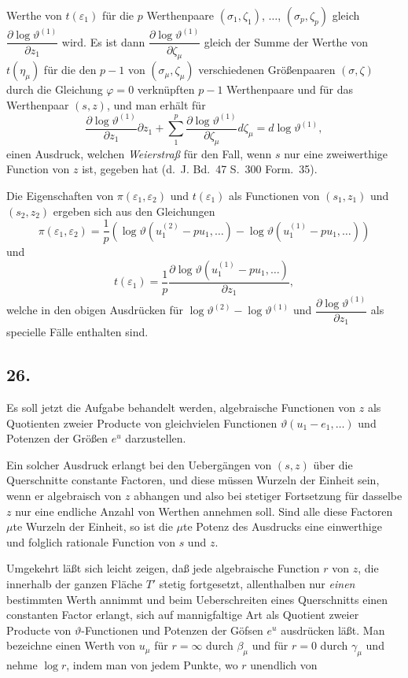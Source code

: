 \documentclass{article}
\begin{document}
Werthe von $t(\varepsilon_{1})$ für die $p$ Werthenpaare $(\sigma_{1}, \zeta_{1})$, $\ldots$, $(\sigma_{p}, \zeta_{p})$ gleich $\dfrac{\partial \log\vartheta^{(1)}}{\partial z_{1}}$ wird. Es ist dann $\dfrac{\partial \log\vartheta^{(1)}}{\partial \zeta_{\mu}}$ gleich der Summe der Werthe von $t(\eta_{\mu})$ für die den $p-1$ von $(\sigma_{\mu}, \zeta_{\mu})$ verschiedenen Größenpaaren $(\sigma, \zeta)$ durch die Gleichung $\varphi = 0$ verknüpften $p-1$ Werthenpaare und für das Werthenpaar $(s, z)$, und man erhält für
\[ \frac{\partial \log\vartheta^{(1)}}{\partial z_{1}} \partial z_{1} + \sum_{1}^{p} \frac{\partial \log\vartheta^{(1)}}{\partial \zeta_{\mu}} d\zeta_{\mu} = d\log\vartheta^{(1)}, \]
einen Ausdruck, welchen \emph{Weierstraß} für den Fall, wenn $s$ nur eine zweiwerthige Function von $z$ ist, gegeben hat (d.~J. Bd.~47 S.~300 Form.~35).

Die Eigenschaften von $\pi(\varepsilon_{1}, \varepsilon_{2})$ und $t(\varepsilon_{1})$ als Functionen von $(s_{1}, z_{1})$ und $(s_{2}, z_{2})$ ergeben sich aus den Gleichungen
\[ \pi(\varepsilon_{1}, \varepsilon_{2}) = \frac{1}{p}\left(\log\vartheta(u_{1}^{(2)} - p u_{1}, \ldots) - \log\vartheta(u_{1}^{(1)} - p u_{1}, \ldots)\right) \]
und
\[ t(\varepsilon_{1}) = \frac{1}{p} \frac{\partial \log\vartheta(u_{1}^{(1)} - p u_{1}, \ldots)}{\partial z_{1}}, \]
welche in den obigen Ausdrücken für $\log\vartheta^{(2)} - \log\vartheta^{(1)}$ und $\dfrac{\partial \log\vartheta^{(1)}}{\partial z_{1}}$ als specielle Fälle enthalten sind.

\subsection*{26.}

Es soll jetzt die Aufgabe behandelt werden, algebraische Functionen von $z$ als Quotienten zweier Producte von gleichvielen Functionen $\vartheta(u_{1}-e_{1}, \ldots)$ und Potenzen der Größen $e^{u}$ darzustellen.

Ein solcher Ausdruck erlangt bei den Uebergängen von $(s, z)$ über die Querschnitte constante Factoren, und diese müssen Wurzeln der Einheit sein, wenn er algebraisch von $z$ abhangen und also bei stetiger Fortsetzung für dasselbe $z$ nur eine endliche Anzahl von Werthen annehmen soll. Sind alle diese Factoren $\mu$te Wurzeln der Einheit, so ist die $\mu$te Potenz des Ausdrucks eine einwerthige und folglich rationale Function von $s$ und $z$.

Umgekehrt läßt sich leicht zeigen, daß jede algebraische Function $r$ von $z$, die innerhalb der ganzen Fläche $T'$ stetig fortgesetzt, allenthalben nur \emph{einen} bestimmten Werth annimmt und beim Ueberschreiten eines Querschnitts einen constanten Factor erlangt, sich auf mannigfaltige Art als Quotient zweier Producte von $\vartheta$-Functionen und Potenzen der Göfsen $e^{u}$ ausdrücken läßt. Man bezeichne einen Werth von $u_{\mu}$ für $r = \infty$ durch $\beta_{\mu}$ und für $r = 0$ durch $\gamma_{\mu}$ und nehme $\log r$, indem man von jedem Punkte, wo $r$ unendlich von
\end{document}
